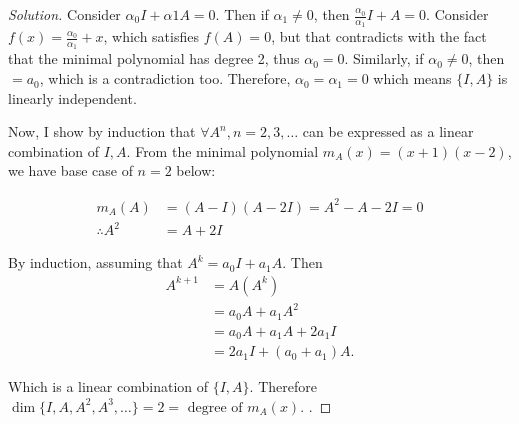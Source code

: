 \documentclass[12pt, a4paper]{article}
\begin{document}
\begin{enumerate}
\begin{enumerate}
\begin{proof}[Solution]
          Consider $\alpha_0I+\alpha1A=0$. Then if $\alpha_1\neq0$, then
          $\frac{\alpha_0}{\alpha_1}I+A=0$. Consider
          $f(x)=\frac{\alpha_0}{\alpha_1}+x$, which satisfies $f(A)=0$, but that
          contradicts with the fact that the minimal polynomial has degree 2,
          thus $\alpha_0=0$. Similarly, if $\alpha_0\neq0$, then$=a_0$, which is
          a contradiction too. Therefore, $\alpha_0=\alpha_1=0$ which means
          $\{I,A\}$ is linearly independent.

          Now, I show by induction that $\forall A^n, n=2,3,\dots$ can be
          expressed as a linear combination of ${I,A}$. From the minimal
          polynomial \( m_A(x)=(x+1)(x-2) \), we have base case of $n=2$ below:

          \begin{align*}
            m_A(A)&=(A-I)(A-2I)=A^2-A-2I=0\\
            \therefore A^2&=A+2I
          \end{align*}

          By induction, assuming that $A^k=a_0I+a_1A$. Then
          \begin{align*}
            A^{k+1}&=A(A^k)\\&=a_0A+a_1A^2\\&=a_0A+a_1A+2a_1I\\&=2a_1I+(a_0+a_1)A
            .\end{align*}

          Which is a linear combination of $\{I,A\}$. Therefore
          $\dim\{I,A,A^2,A^3,\dots\}=2=\text{ degree of }m_A(x)$.
          .\end{proof}
    \end{enumerate}


\end{enumerate}
\end{document}
